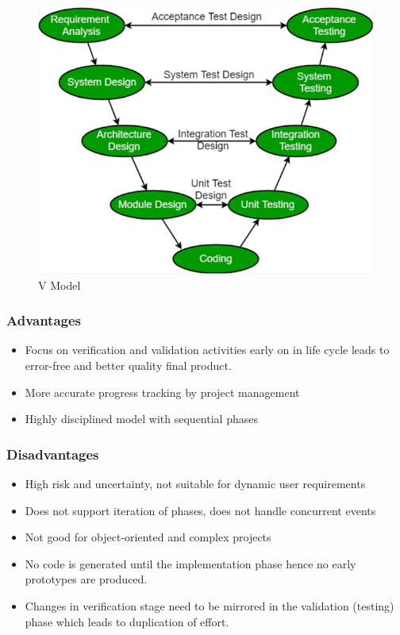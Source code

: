 \documentclass{article}
\begin{document}
\begin{figure}[!h]
    \centering
    \includegraphics[scale=0.7]{se2.png}
    \caption{V Model}
    \label{fig:my_label_2}
\end{figure}

\subsubsection{Advantages}
\begin{itemize}
    \item Focus on verification and validation activities early on in life cycle leads to error-free and better quality final product. 
    
    \item More accurate progress tracking by project management
    
    \item Highly disciplined model with sequential phases 
\end{itemize}

\subsubsection{Disadvantages}
\begin{itemize}
    \item High risk and uncertainty, not suitable for dynamic user requirements
    
    \item Does not support iteration of phases, does not handle concurrent events
    
    \item Not good for object-oriented and complex projects
    
    \item No code is generated until the implementation phase hence no early prototypes are produced. 
    
    \item Changes in verification stage need to be mirrored in the validation (testing) phase which leads to duplication of effort. 
\end{itemize}
\end{document}
